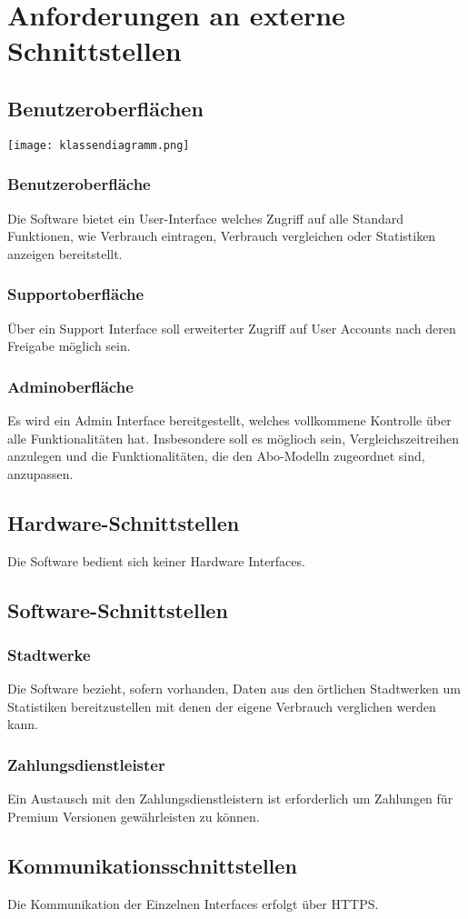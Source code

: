 \section{Anforderungen an externe Schnittstellen}
\subsection{Benutzeroberflächen}
\texttt{[image: klassendiagramm.png]}
\subsubsection{Benutzeroberfläche}
Die Software bietet ein User-Interface welches Zugriff auf alle Standard Funktionen, wie Verbrauch eintragen, Verbrauch vergleichen oder Statistiken anzeigen bereitstellt.
\subsubsection{Supportoberfläche}
Über ein Support Interface soll erweiterter Zugriff auf User Accounts nach deren Freigabe möglich sein.
\subsubsection{Adminoberfläche}
Es wird ein Admin Interface bereitgestellt, welches vollkommene Kontrolle über alle Funktionalitäten hat.
Insbesondere soll es möglioch sein, Vergleichszeitreihen anzulegen und die Funktionalitäten, die den Abo-Modelln zugeordnet sind, anzupassen.
\subsection{Hardware-Schnittstellen}
Die Software bedient sich keiner Hardware Interfaces.
\subsection{Software-Schnittstellen}
\subsubsection{Stadtwerke}
Die Software bezieht, sofern vorhanden, Daten aus den örtlichen Stadtwerken um Statistiken bereitzustellen mit denen der eigene Verbrauch verglichen werden kann.
\subsubsection{Zahlungsdienstleister}
Ein Austausch mit den Zahlungsdienstleistern ist erforderlich um Zahlungen für Premium Versionen gewährleisten zu können.
\subsection{Kommunikationsschnittstellen}
Die Kommunikation der Einzelnen Interfaces erfolgt über HTTPS.